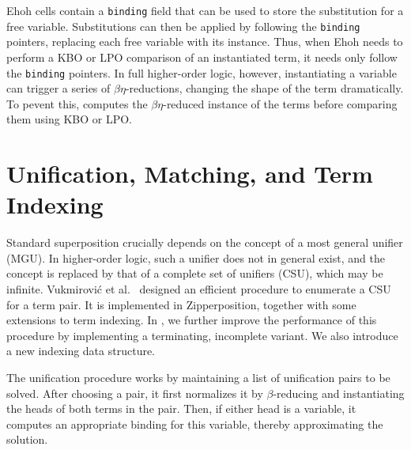 Ehoh cells contain a \verb|binding| field that can be used to store the
substitution for a free variable. Substitutions can then be applied by following
the \texttt{binding} pointers, replacing each free variable with its instance.
Thus, when Ehoh needs to perform a KBO or LPO comparison of an instantiated term,
it needs only follow the \texttt{binding} pointers.
In full higher-order logic, however, instantiating a variable can trigger a
series of $\beta\eta$-reductions,
changing the shape of the term dramatically. To pevent this, \ehohii{}
computes the $\beta\eta$-reduced instance of the terms
before comparing them using KBO or LPO.

\section{Unification, Matching, and Term Indexing}
\label{sec:ehoh2:unif-match-index}


Standard superposition crucially depends on the concept of a most general unifier
(MGU).
In higher-order logic, such a unifier does not in general exist, and the concept
is replaced by that of a complete set of unifiers (CSU), which may be infinite.
Vukmirovi\'c et al.\ \cite{unif-section} designed an efficient
procedure to enumerate a CSU for a term pair. It is implemented in Zipperposition, together with some extensions to term indexing.
In \ehohii{}, we further improve the performance of this procedure by implementing a terminating,
incomplete variant. We also introduce a new indexing data structure.

The unification procedure works by maintaining a list of unification pairs to be solved.
After choosing a pair, it first normalizes it by $\beta$-reducing and
instantiating the heads of both terms in the pair. Then, if either head is a
variable, it computes an appropriate binding for this variable, thereby
approximating the solution.

